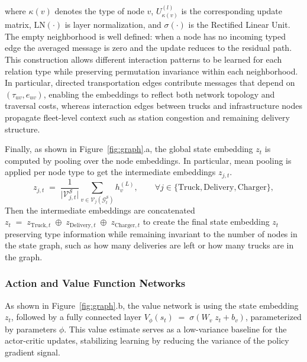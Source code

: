 \documentclass[a4paper,fleqn]{cas-sc}
\begin{document}
where $\kappa(v)$ denotes the type of node $v$, $U^{(l)}_{\kappa(v)}$ is the corresponding update matrix, $\mathrm{LN}(\cdot)$ is layer normalization, and $\sigma(\cdot)$ is the Rectified Linear Unit. The empty neighborhood is well defined: when a node has no incoming typed edge the averaged message is zero and the update reduces to the residual path. This construction allows different interaction patterns to be learned for each relation type while preserving permutation invariance within each neighborhood. In particular, directed transportation edges contribute messages that depend on $(\tau_{uv},e_{uv})$, enabling the embeddings to reflect both network topology and traversal costs, whereas interaction edges between trucks and infrastructure nodes propagate fleet-level context such as station congestion and remaining delivery structure.

Finally, as shown in Figure~\ref{fig:graph}.a, the global state embedding $z_t$ is computed by pooling over the node embeddings. In particular, mean pooling is applied per node type to get the intermediate embeddings $z_{j,t}$.
\begin{equation}
z_{j,t}
\;=\;
\frac{1}{\lvert \mathcal{V}^{\mathcal{S}}_{j,t}\rvert}
\sum_{v\in \mathcal{V}_j(\mathcal{G}^{\mathcal{S}}_t)} h_v^{(L)},
\qquad \forall j\in\{\mathrm{Truck},\mathrm{Delivery},\mathrm{Charger}\},
\label{eq:mean_pool_type}
\end{equation}
 Then the intermediate embeddings are concatenated
$z_t \;=\; z_{\mathrm{Truck},t} \;\oplus\; z_{\mathrm{Delivery},t} \;\oplus\; z_{\mathrm{Charger},t}$
to create the final state embedding $z_t$ preserving type information while remaining invariant to the number of nodes in the state graph, such as how many deliveries are left or how many trucks are in the graph.

\subsubsection{Action and Value Function Networks}

As shown in Figure~\ref{fig:graph}.b, the value network is using the state embedding $z_t$, followed by a fully connected layer
$V_{\phi}(s_t)\;=\;\sigma\!\left(W_v \; z_t + b_v\right)$, parameterized by parameters $\phi$.
This value estimate serves as a low-variance baseline for the actor-critic updates, stabilizing learning by reducing the variance of the policy gradient signal.
\end{document}
